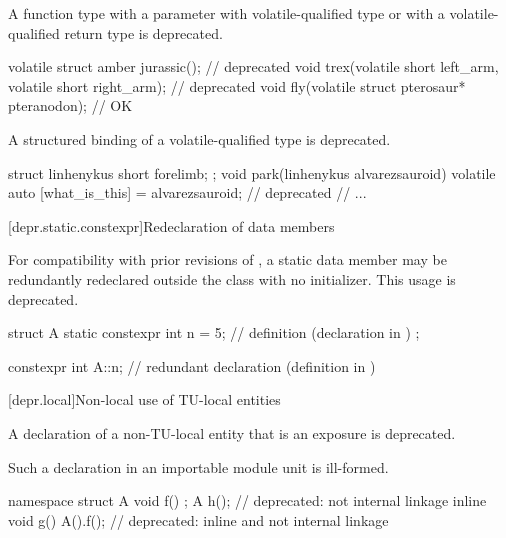 \pnum
A function type
with a parameter with volatile-qualified type or
with a volatile-qualified return type is deprecated.

\begin{example}
\begin{codeblock}
volatile struct amber jurassic();                               // deprecated
void trex(volatile short left_arm, volatile short right_arm);   // deprecated
void fly(volatile struct pterosaur* pteranodon);                // OK
\end{codeblock}
\end{example}


\pnum
A structured binding of a volatile-qualified type
is deprecated.

\begin{example}
\begin{codeblock}
struct linhenykus { short forelimb; };
void park(linhenykus alvarezsauroid) {
  volatile auto [what_is_this] = alvarezsauroid;                // deprecated
  // ...
}
\end{codeblock}
\end{example}


[depr.static.constexpr]{Redeclaration of  data members}

\pnum
For compatibility with prior revisions of \Cpp{}, a 
static data member may be redundantly redeclared outside the class with no initializer.
This usage is deprecated.
\begin{example}
\begin{codeblock}
struct A {
  static constexpr int n = 5;   // definition (declaration in \CppXIV{})
};

constexpr int A::n;             // redundant declaration (definition in \CppXIV{})
\end{codeblock}
\end{example}

\newpage

[depr.local]{Non-local use of TU-local entities}

\pnum
A declaration of a non-TU-local entity that is an exposure
is deprecated.
\begin{note}
Such a declaration in an importable module unit is ill-formed.
\end{note}
\begin{example}
\begin{codeblock}
namespace {
  struct A {
    void f() {}
  };
}
A h();                          // deprecated: not internal linkage
inline void g() {A().f();}      // deprecated: inline and not internal linkage
\end{codeblock}
\end{example}

